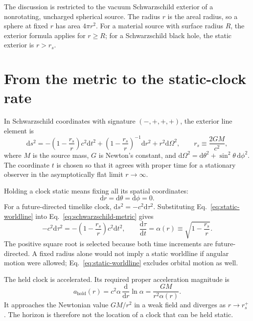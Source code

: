 \documentclass[12pt]{article}
\begin{document}
The discussion is restricted to the vacuum Schwarzschild exterior of a nonrotating, uncharged spherical source. The radius $r$ is the areal radius, so a sphere at fixed $r$ has area $4\pi r^2$. For a material source with surface radius $R$, the exterior formula applies for $r\ge R$; for a Schwarzschild black hole, the static exterior is $r>r_s$.

\section{From the metric to the static-clock rate}

In Schwarzschild coordinates with signature $(-,+,+,+)$, the exterior line element is \cite{Schwarzschild,Tong}
\begin{equation}
  \mathrm{d}s^2
  =-\left(1-\frac{r_s}{r}\right)c^2\mathrm{d}t^2
   +\left(1-\frac{r_s}{r}\right)^{-1}\mathrm{d}r^2
   +r^2\mathrm{d}\Omega^2,
  \qquad
  r_s\equiv\frac{2GM}{c^2},
  \label{eq:schwarzschild-metric}
\end{equation}
where $M$ is the source mass, $G$ is Newton's constant, and $\mathrm{d}\Omega^2=\mathrm{d}\theta^2+\sin^2\theta\,\mathrm{d}\phi^2$. The coordinate $t$ is chosen so that it agrees with proper time for a stationary observer in the asymptotically flat limit $r\to\infty$.

Holding a clock static means fixing all its spatial coordinates:
\begin{equation}
  \mathrm{d}r=\mathrm{d}\theta=\mathrm{d}\phi=0.
  \label{eq:static-worldline}
\end{equation}
For a future-directed timelike clock, $\mathrm{d}s^2=-c^2\mathrm{d}\tau^2$. Substituting Eq.~\eqref{eq:static-worldline} into Eq.~\eqref{eq:schwarzschild-metric} gives
\begin{equation}
  -c^2\mathrm{d}\tau^2
  =-\left(1-\frac{r_s}{r}\right)c^2\mathrm{d}t^2,
  \qquad
  \boxed{\frac{\mathrm{d}\tau}{\mathrm{d}t}
  =\alpha(r)\equiv\sqrt{1-\frac{r_s}{r}}.}
  \label{eq:lapse}
\end{equation}
The positive square root is selected because both time increments are future-directed. A fixed radius alone would not imply a static worldline if angular motion were allowed; Eq.~\eqref{eq:static-worldline} excludes orbital motion as well.

The held clock is accelerated. Its required proper acceleration magnitude is
\begin{equation}
  a_{\mathrm{hold}}(r)
  =c^2\alpha\,\frac{\mathrm{d}}{\mathrm{d}r}\ln\alpha
  =\frac{GM}{r^2\alpha(r)}.
  \label{eq:holding-acceleration}
\end{equation}
It approaches the Newtonian value $GM/r^2$ in a weak field and diverges as $r\to r_s^+$. The horizon is therefore not the location of a clock that can be held static.
\end{document}
